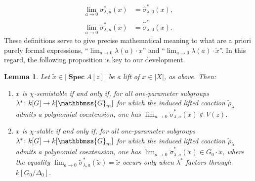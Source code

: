 \documentclass[11pt,a4paper,reqno,noamsfonts]{amsart}
\numberwithin{equation}{section}
\newtheorem{lemma}[theorem]{Lemma}
\theoremstyle{definition}
\theoremstyle{remark}
\newcommand{\GG}{\ensuremath{\mathbbmss{G}}}
\DeclareMathOperator{\sSpec}{\mathbf{Spec}}
\begin{document}
\begin{equation}
\begin{aligned}
\lim _{a\rightarrow 0}\sigma _{\lambda ,a}^{*}(x)&=\hat{\sigma} _{\lambda,0}^{*}(x),\\
 \lim _{a\rightarrow 0}\tilde{\sigma }_{\lambda ,a}^{*}(\tilde{x})&= \hat{\tilde{\sigma }}_{\lambda ,0}^{*}(\tilde{x}).
\end{aligned}
\end{equation}
These definitions serve to give precise mathematical meaning to what are a priori purely formal expressions, ``$\displaystyle \lim_{a \to 0} \lambda(a) \cdot x$'' and ``$\displaystyle \lim_{a \to 0} \lambda(a) \cdot \tilde{x}$''. In this regard, the following proposition is key to our development.

\begin{lemma}\label{lem:4.10}
Let $\tilde{x} \in \lvert \sSpec A[z] \rvert$ be a lift of $x \in \lvert X \rvert$, as above. Then:
\begin{enumerate}
\item $x$ is $\chi$-semistable if and only if, for all one-parameter subgroups $\lambda^{*} \colon k[G] \to k[\GG_m]$ for which the induced lifted coaction $\tilde{\rho}_{\lambda}$ admits a polynomial coextension, one has $\displaystyle \lim _{a\rightarrow 0}\tilde{\sigma }_{\lambda ,a}^{*}(\tilde{x})\notin V(z)$.

\item $x$ is $\chi$-stable if and only if, for all one-parameter subgroups $\lambda^{*} \colon k[G] \to k[\GG_m]$ for which the induced lifted coaction $\tilde{\rho}_{\lambda}$ admits a polynomial coextension, one has $\displaystyle \lim_{a \to 0} \tilde{\sigma}_{\lambda,a}^*(\tilde{x}) \in G_0 \cdot \tilde{x}$, where the equality $\displaystyle \lim_{a \to 0} \tilde{\sigma}_{\lambda,a}^*(\tilde{x}) = \tilde{x}$ occurs only when $\lambda ^{*}$ factors through $k[G_0/\Delta_0]$.
\end{enumerate}
\end{lemma}
\end{document}
